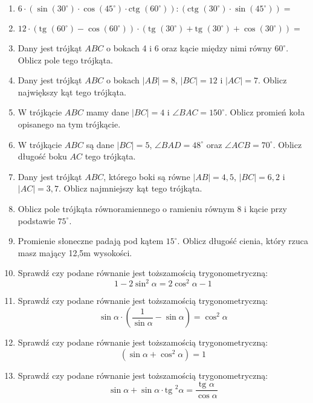 \documentclass[12pt,a4paper]{article}
\begin{document}
\begin{enumerate}[1.]
	\item $6\cdot (\sin(30^\circ)\cdot\cos(45^\circ)\cdot\text{ctg }(60^\circ)):(\text{ctg }(30^\circ)\cdot\sin(45^\circ))=$	
	
	\item $12\cdot(\text{tg }(60^\circ)-\cos(60^\circ))\cdot(\text{tg }(30^\circ)+\text{tg }(30^\circ)+\cos(30^\circ))=$	

	\item Dany jest trójkąt $ABC$ o bokach 4 i 6 oraz kącie między nimi równy $60^\circ$. Oblicz pole tego trójkąta.
	
	\item Dany jest trójkąt $ABC$ o bokach $|AB|=8$, $|BC|=12$ i $|AC|=7$. Oblicz największy kąt tego trójkąta.
	 
	\item W trójkącie $ABC$ mamy dane $|BC|=4$ i $\angle BAC=150^\circ$. Oblicz promień koła opisanego na tym trójkącie.
	
	\item W trójkącie $ABC$ są dane $|BC|=5$, $\angle BAD=48^\circ$ oraz $\angle ACB=70^\circ$. Oblicz długość boku $AC$ tego trójkąta.
	
	\item Dany jest trójkąt $ABC$, którego boki są równe $|AB|=4,5$, $|BC|=6,2$ i $|AC|=3,7$. Oblicz najmniejszy kąt tego trójkąta.
	
	\item Oblicz pole trójkąta równoramiennego o ramieniu równym 8 i kącie przy podstawie $75^\circ$.
	
	\item Promienie słoneczne padają pod kątem $15^\circ$. Oblicz długość cienia, który rzuca masz mający 12,5m wysokości.
	
	\item Sprawdź czy podane równanie jest toższamością trygonometryczną:
	$$1-2\sin^2\alpha = 2\cos^2\alpha - 1$$
	
	\item Sprawdź czy podane równanie jest toższamością trygonometryczną:
	$$\sin\alpha \cdot (\frac{1}{\sin\alpha}-\sin\alpha)=\cos^2\alpha$$
	
	\item Sprawdź czy podane równanie jest toższamością trygonometryczną:
	$$(\sin\alpha + \cos^2\alpha)=1$$
	
	\item Sprawdź czy podane równanie jest toższamością trygonometryczną:
	$$\sin\alpha + \sin\alpha \cdot \text{tg }^2\alpha=\frac{\text{tg }\alpha}{\cos\alpha}$$
	

\end{enumerate}
\end{document}
